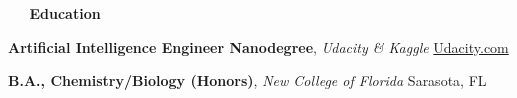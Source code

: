 \documentclass[a4paper,12pt]{article}
\newcommand{\resheading}[1]{{\vspace*{.06in} \colorbox{mygrey}{\begin{minipage}{\textwidth}{\textmd{\large \textbf{#1} \vphantom{p\^{E}}}}\end{minipage}}} }
\newcommand{\ressubheading}[4]{
        \textbf{#1} \hfill #2\\
        \textit{#3} \hfill #4 \\}
\begin{document}
\resheading{~\faGraduationCap~ Education}

\textbf{Artificial Intelligence Engineer Nanodegree}, \textit{Udacity \& Kaggle} \hfill {\href{https://www.udacity.com/nanodegree}{Udacity.com}}
 
\textbf{B.A., Chemistry/Biology (Honors)}, \textit{New College of Florida} \hfill Sarasota, FL

 
\end{document}
